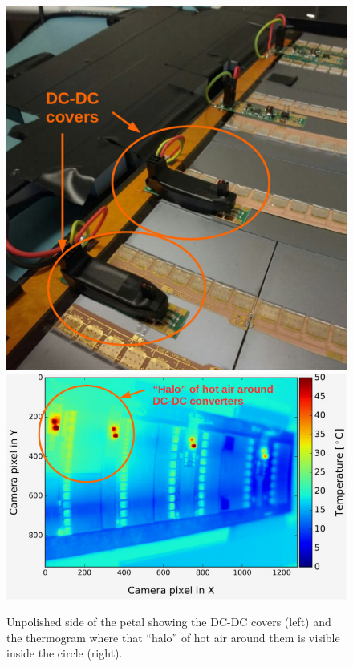 		\begin{figure}[ht!]
			\centering
			\captionsetup{justification=centering,margin=2cm}
			\includegraphics[scale=0.33]{Figures/Chapter02/DCDC_covers.jpg}
			\includegraphics[scale=0.46]{Figures/Chapter02/HaloThermogram.jpg}
			\caption{Unpolished side of the petal showing the DC-DC covers (left) and the thermogram where that “halo” of hot air around them is visible inside the circle (right).}\label{fig2.8}
		\end{figure}
	
